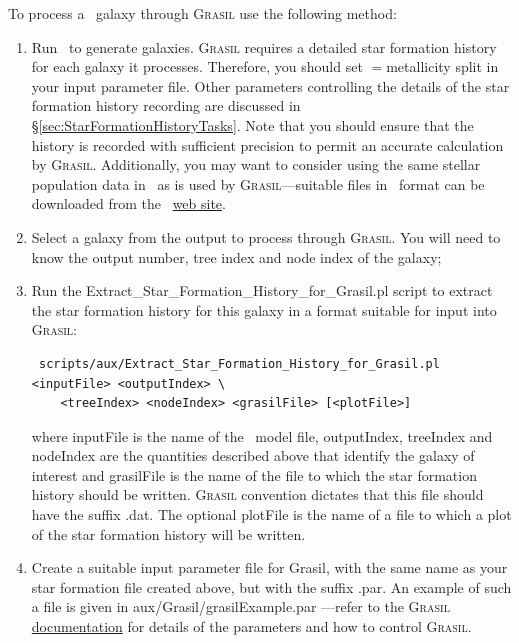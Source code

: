 To process a \glc\ galaxy through {\normalfont \scshape Grasil} use the following method:
\begin{enumerate}
 \item Run \glc\ to generate galaxies. {\normalfont \scshape Grasil} requires a detailed star formation history for each galaxy it processes. Therefore, you should set {\normalfont \ttfamily [starFormationHistoriesMethod]}$=${\normalfont \ttfamily metallicity split} in your input parameter file. Other parameters controlling the details of the star formation history recording are discussed in \S\ref{sec:StarFormationHistoryTasks}. Note that you should ensure that the history is recorded with sufficient precision to permit an accurate calculation by {\normalfont \scshape Grasil}. Additionally, you may want to consider using the same stellar population data in \glc\ as is used by {\normalfont \scshape Grasil}---suitable files in \glc\ format can be downloaded from the \glc\ \href{https://sites.google.com/site/galacticusmodel/home/auxiliary-data}{web site}.
 \item Select a galaxy from the output to process through {\normalfont \scshape Grasil}. You will need to know the output number, tree index and node index of the galaxy;
 \item Run the {\normalfont \ttfamily Extract\_Star\_Formation\_History\_for\_Grasil.pl} script to extract the star formation history for this galaxy in a format suitable for input into {\normalfont \scshape Grasil}:
\begin{verbatim}
 scripts/aux/Extract_Star_Formation_History_for_Grasil.pl <inputFile> <outputIndex> \
    <treeIndex> <nodeIndex> <grasilFile> [<plotFile>]
\end{verbatim}
where {\normalfont \ttfamily inputFile} is the name of the \glc\ model file, {\normalfont \ttfamily outputIndex}, {\normalfont \ttfamily treeIndex} and {\normalfont \ttfamily nodeIndex} are the quantities described above that identify the galaxy of interest and {\normalfont \ttfamily grasilFile} is the name of the file to which the star formation history should be written. {\normalfont \scshape Grasil} convention dictates that this file should have the suffix {\normalfont \ttfamily .dat}. The optional {\normalfont \ttfamily plotFile} is the name of a file to which a plot of the star formation history will be written.
 \item Create a suitable input parameter file for {\normalfont \ttfamily Grasil}, with the same name as your star formation file created above, but with the suffix {\normalfont \ttfamily .par}. An example of such a file is given in {\normalfont \ttfamily aux/Grasil/grasilExample.par} ---refer to the {\normalfont \scshape Grasil} \href{http://adlibitum.oat.ts.astro.it/silva/grasil/grasil.doc}{documentation} for details of the parameters and how to control {\normalfont \scshape Grasil}. 

\end{enumerate}
